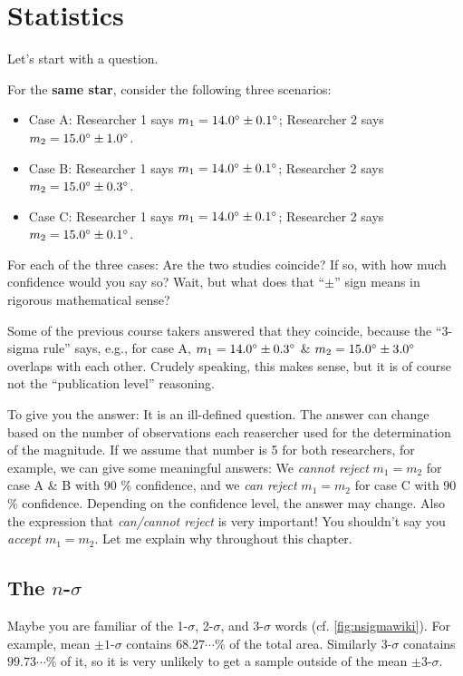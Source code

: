 \chapter{Statistics}

Let's start with a question. 
\begin{ex}
  For the \textbf{same star}, consider the following three scenarios:
  \begin{itemize}
    \item Case A: Researcher 1 says $ m_1 =  \m{14.0} \pm \m{0.1} $; Researcher 2 says $ m_2 = \m{15.0} \pm \m{1.0} $.
    \item Case B: Researcher 1 says $ m_1 =  \m{14.0} \pm \m{0.1} $; Researcher 2 says $ m_2 = \m{15.0} \pm \m{0.3} $.
    \item Case C: Researcher 1 says $ m_1 =  \m{14.0} \pm \m{0.1} $; Researcher 2 says $ m_2 = \m{15.0} \pm \m{0.1} $.
  \end{itemize}
  For each of the three cases: Are the two studies coincide? If so, with how much confidence would you say so? Wait, but what does that ``$ \pm $'' sign means in rigorous mathematical sense?
\end{ex}

Some of the previous course takers answered that they coincide, because the ``3-sigma rule'' says, e.g., for case A, $ m_1 = \m{14.0} \pm \m{0.3} $ \& $ m_2 = \m{15.0} \pm \m{3.0} $ overlaps with each other. Crudely speaking, this makes sense, but it is of course not the ``publication level'' reasoning.

To give you the answer: It is an ill-defined question. The answer can change based on the number of observations each reasercher used for the determination of the magnitude. If we assume that number is 5 for both researchers, for example, we can give some meaningful answers: We \textit{cannot reject} $ m_1 = m_2 $ for case A \& B with 90 \% confidence, and we \textit{can reject} $ m_1 = m_2 $ for case C with 90 \% confidence. Depending on the confidence level, the answer may change. Also the expression that \textit{can/cannot reject} is very important! You shouldn't say you \textit{accept $ m_1 = m_2 $}. Let me explain why throughout this chapter.


\section{The $ n $-$ \sigma $} \label{sec: n-sigma notation}
Maybe you are familiar of the 1-$ \sigma $, 2-$ \sigma $, and 3-$ \sigma $ words (cf. \cref{fig:nsigmawiki}). For example, mean $ \pm 1$-$ \sigma $ contains $ 68.27\cdots \% $ of the total area. Similarly 3-$ \sigma $ conatains $ 99.73\cdots \% $ of it, so it is very unlikely to get a sample outside of the mean $ \pm 3 $-$ \sigma $. 

